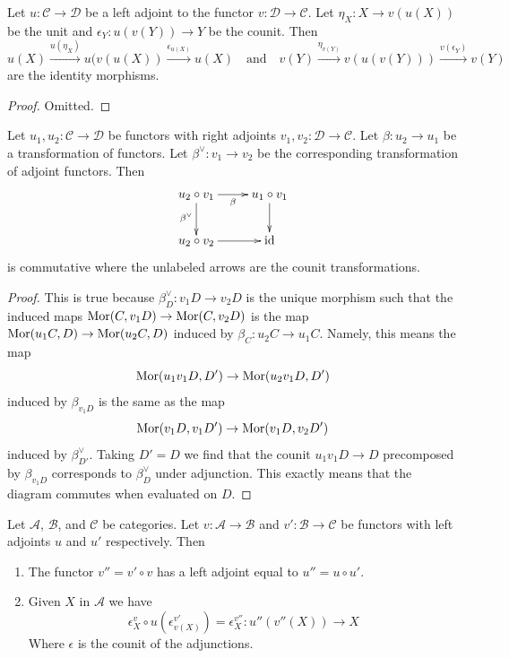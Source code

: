 \begin{lemma}
\label{lemma-unit-counit-relations}
Let $u : \mathcal{C} \to \mathcal{D}$ be a left adjoint to the functor
$v : \mathcal{D} \to \mathcal{C}$. Let $\eta_X : X \to v(u(X))$ be the unit
and $\epsilon_Y : u(v(Y)) \to Y$ be the counit. Then
$$
u(X) \xrightarrow{u(\eta_X)} u(v(u(X))
\xrightarrow{\epsilon_{u(X)}} u(X)
\quad\text{and}\quad
v(Y) \xrightarrow{\eta_{v(Y)}} v(u(v(Y))) \xrightarrow{v(\epsilon_Y)}
v(Y)
$$
are the identity morphisms.
\end{lemma}

\begin{proof}
Omitted.
\end{proof}

\begin{lemma}
\label{lemma-transformation-between-functors-and-adjoints}
Let $u_1, u_2 : \mathcal{C} \to \mathcal{D}$ be functors with right
adjoints $v_1, v_2 : \mathcal{D} \to \mathcal{C}$. Let $\beta : u_2 \to u_1$
be a transformation of functors. Let $\beta^\vee : v_1 \to v_2$ be
the corresponding transformation of adjoint functors. Then
$$
\xymatrix{
u_2 \circ v_1 \ar[r]_\beta \ar[d]_{\beta^\vee} &
u_1 \circ v_1 \ar[d] \\
u_2 \circ v_2 \ar[r] & \text{id}
}
$$
is commutative where the unlabeled arrows are the counit transformations.
\end{lemma}

\begin{proof}
This is true because $\beta^\vee_D : v_1D \to v_2D$ is the unique
morphism such that the induced maps $\mathop{\mathrm{Mor}}\nolimits(C, v_1D) \to \mathop{\mathrm{Mor}}\nolimits(C, v_2D)$
is the map $\mathop{\mathrm{Mor}}\nolimits(u_1C, D) \to \mathop{\mathrm{Mor}}\nolimits(u_2C, D)$ induced by
$\beta_C : u_2C \to u_1C$. Namely, this means the map
$$
\mathop{\mathrm{Mor}}\nolimits(u_1 v_1 D, D') \to \mathop{\mathrm{Mor}}\nolimits(u_2 v_1 D, D')
$$
induced by $\beta_{v_1 D}$ is the same as the map
$$
\mathop{\mathrm{Mor}}\nolimits(v_1 D, v_1 D') \to \mathop{\mathrm{Mor}}\nolimits(v_1 D, v_2 D')
$$
induced by $\beta^\vee_{D'}$. Taking $D' = D$ we find that the counit
$u_1 v_1 D \to D$ precomposed by $\beta_{v_1D}$ corresponds to $\beta^\vee_D$
under adjunction. This exactly means that the diagram commutes when
evaluated on $D$.
\end{proof}

\begin{lemma}
\label{lemma-compose-counits}
Let $\mathcal{A}$, $\mathcal{B}$, and $\mathcal{C}$ be categories.
Let $v : \mathcal{A} \to \mathcal{B}$ and
$v' : \mathcal{B} \to \mathcal{C}$ be functors
with left adjoints $u$ and $u'$ respectively. Then
\begin{enumerate}
\item The functor $v'' = v' \circ v$ has a left adjoint equal to
$u'' = u \circ u'$.
\item Given $X$ in $\mathcal{A}$ we have
\begin{equation}
\label{equation-compose-counits}
\epsilon_X^v \circ u(\epsilon^{v'}_{v(X)}) = \epsilon^{v''}_X :
u''(v''(X)) \to X
\end{equation}
Where $\epsilon$ is the counit of the adjunctions.
\end{enumerate}
\end{lemma}

